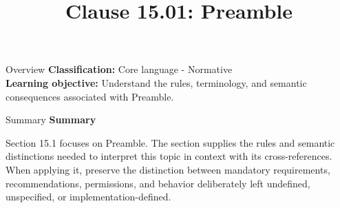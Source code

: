 \documentclass[10pt,letterpaper]{article}
\title{Clause 15.01: Preamble}
\author{}
\date{}
\begin{document}
\maketitle
\begin{CornellOverviewBox}{Overview}
\textbf{Classification:} Core language - Normative\\[2pt]
\textbf{Learning objective:} Understand the rules, terminology, and semantic consequences associated with Preamble.
\end{CornellOverviewBox}\begin{CornellSummaryBox}{Summary}
{\sffamily\bfseries\color{Accent} Summary}\par\vspace{3pt}Section 15.1 focuses on Preamble. The section supplies the rules and semantic distinctions needed to interpret this topic in context with its cross-references. When applying it, preserve the distinction between mandatory requirements, recommendations, permissions, and behavior deliberately left undefined, unspecified, or implementation-defined.
\end{CornellSummaryBox}
\end{document}
